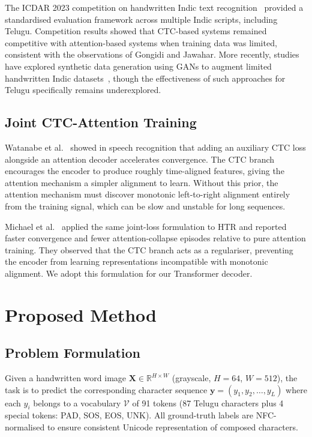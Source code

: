 \documentclass[pdflatex,sn-mathphys-num]{sn-jnl}
\begin{document}
The ICDAR 2023 competition on handwritten Indic text recognition~\cite{icdar2023indic} provided a standardised evaluation framework across multiple Indic scripts, including Telugu. Competition results showed that CTC-based systems remained competitive with attention-based systems when training data was limited, consistent with the observations of Gongidi and Jawahar. More recently, studies have explored synthetic data generation using GANs to augment limited handwritten Indic datasets~\cite{kang2020ganwriting}, though the effectiveness of such approaches for Telugu specifically remains underexplored.

\subsection{Joint CTC-Attention Training}\label{sec:related:joint}

Watanabe et al.~\cite{watanabe2017hybrid} showed in speech recognition that adding an auxiliary CTC loss alongside an attention decoder accelerates convergence. The CTC branch encourages the encoder to produce roughly time-aligned features, giving the attention mechanism a simpler alignment to learn. Without this prior, the attention mechanism must discover monotonic left-to-right alignment entirely from the training signal, which can be slow and unstable for long sequences.

Michael et al.~\cite{michael2019evaluating} applied the same joint-loss formulation to HTR and reported faster convergence and fewer attention-collapse episodes relative to pure attention training. They observed that the CTC branch acts as a regulariser, preventing the encoder from learning representations incompatible with monotonic alignment. We adopt this formulation for our Transformer decoder.

\section{Proposed Method}\label{sec:method}

\subsection{Problem Formulation}\label{sec:method:problem}

Given a handwritten word image $\mathbf{X} \in \mathbb{R}^{H \times W}$ (grayscale, $H = 64$, $W = 512$), the task is to predict the corresponding character sequence $\mathbf{y} = (y_1, y_2, \ldots, y_L)$ where each $y_i$ belongs to a vocabulary $\mathcal{V}$ of 91 tokens (87 Telugu characters plus 4 special tokens: PAD, SOS, EOS, UNK). All ground-truth labels are NFC-normalised to ensure consistent Unicode representation of composed characters.
\end{document}

